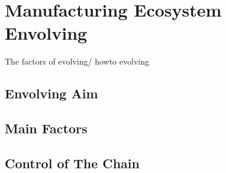 \section{Manufacturing Ecosystem Envolving} %
\label{sec:envolve}
The factors of evolving/ howto evolving

\subsection{Envolving Aim} %
\label{sub:envolving_aim}


\subsection{Main Factors} %
\label{sub:main_factors}


\subsection{Control of The Chain} %
\label{sub:control}

